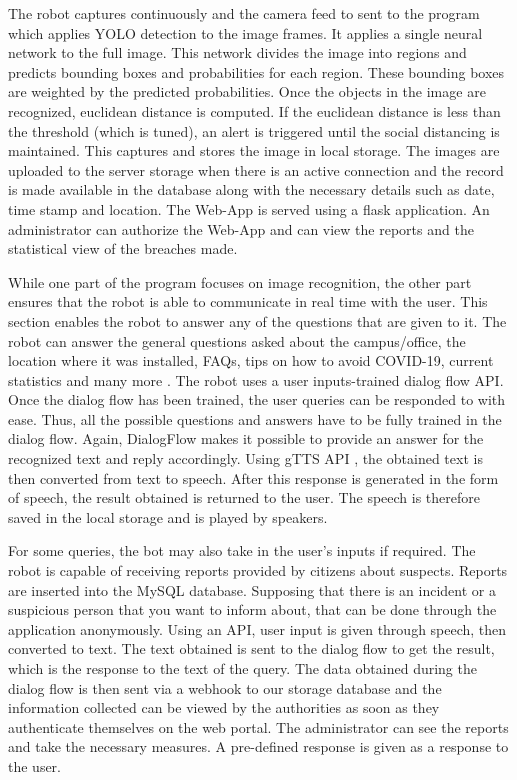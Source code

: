 \documentclass[AMA,STIX1COL]{WileyNJD-v2}
\begin{document}
The robot captures continuously and the camera feed to sent to the program which applies YOLO detection to the image frames. It applies a single neural network to the full image. This network divides the image into regions and predicts bounding boxes and probabilities for each region. These bounding boxes are weighted by the predicted probabilities. Once the objects in the image are recognized, euclidean distance \cite{b17} is computed. If the euclidean distance is less than the threshold (which is tuned), an alert is triggered until the social distancing is maintained.
This captures and stores the image in local storage. The images are uploaded to the server storage when there is an active connection and the record is made available in the database along with the necessary details such as date, time stamp and location.
The Web-App is served using a flask application. An administrator can authorize the Web-App and can view the reports and the statistical view of the breaches made.

While one part of the program focuses on image recognition, the other part ensures that the robot is able to communicate in real time with the user. This section enables the robot to answer any of the questions that are given to it. The robot can answer the general questions asked about the campus/office, the location where it was installed, FAQs, tips on how to avoid COVID-19, current statistics and many more \cite{b18}. The robot uses a user inputs-trained dialog flow API. Once the dialog flow has been trained, the user queries can be responded to with ease. Thus, all the possible questions and answers have to be fully trained in the dialog flow. Again, DialogFlow makes it possible to provide an answer for the recognized text and reply accordingly. Using gTTS API \cite{b19}, the obtained text is then converted from text to speech. After this response is generated in the form of speech, the result obtained is returned to the user. The speech is therefore saved in the local storage and is played by speakers.

For some queries, the bot may also take in the user's inputs if required. The robot is capable of receiving reports provided by citizens about suspects. Reports are inserted into the MySQL database. Supposing that there is an incident or a suspicious person that you want to inform about, that can be done through the application anonymously. Using an  API, user input is given through speech, then converted to text. The text obtained is sent to the dialog flow to get the result, which is the response to the text of the query. The data obtained during the dialog flow is then sent via a webhook to our storage database and the information collected can be viewed by the authorities as soon as they authenticate themselves on the web portal. The administrator can see the reports and take the necessary measures. A pre-defined response is given as a response to the user.
\end{document}
